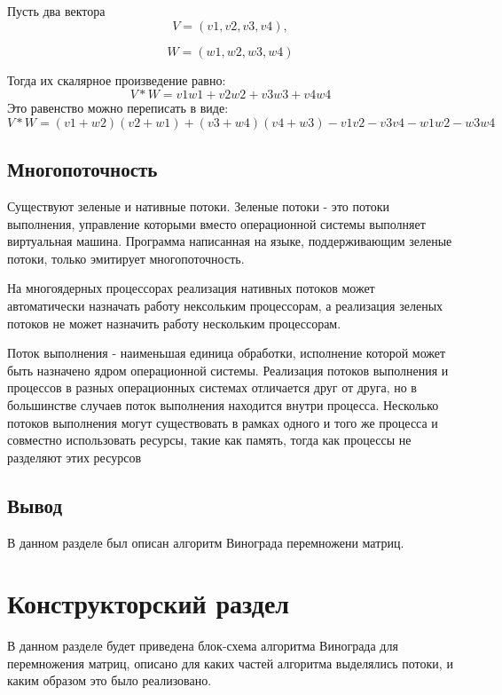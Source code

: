 \documentclass[12pt, a4paper]{report}
\begin{document}
	Пусть два вектора $$V = (v1, v2, v3, v4), $$
	 
	$$W = (w1, w2, w3, w4)$$
	
	Тогда их скалярное произведение равно: 
	$$V * W = v1w1 + v2w2 + v3w3 + v4w4$$
	Это равенство можно переписать в виде: 
	$$V * W = (v1 + w2)(v2 + w1) + (v3 + w4)(v4 + w3) - 
	v1v2 - v3v4 - w1w2 - w3w4$$
	

	\section{Многопоточность}
	
	\hspace{0.6cm}Существуют зеленые и нативные потоки. Зеленые потоки - это потоки выполнения, управление которыми вместо операционной системы выполняет виртуальная машина. Программа написанная на языке, поддерживающим зеленые потоки, только эмитирует многопоточность. 
	
	\vspace{0.3cm}На многоядерных процессорах реализация нативных потоков может автоматически назначать работу нексольким процессорам, а реализация зеленых потоков не может назначить работу нескольким процессорам.
	
	\vspace{0.3cm}Поток выполнения - наименьшая единица обработки, исполнение которой может быть назначено ядром операционной системы. Реализация потоков выполнения и процессов в разных операционных системах отличается друг от друга, но в большинстве случаев поток выполнения находится внутри процесса. Несколько потоков выполнения могут существовать в рамках одного и того же процесса и совместно использовать ресурсы, такие как память, тогда как процессы не разделяют этих ресурсов\cite{bmstu}
	
	\section{Вывод}
	
	В данном разделе был описан алгоритм Винограда перемножени матриц.
	

	\chapter{Конструкторский раздел}
	
	\vspace{-0.6cm}\hspace{0.6cm} В данном разделе будет приведена блок-схема алгоритма Винограда для перемножения матриц, описано для каких частей алгоритма выделялись потоки, и каким образом это было реализовано.
	
\end{document}
